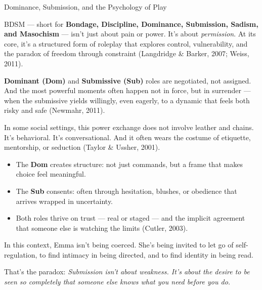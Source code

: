 \begin{TechnicalSidebar}{Dominance, Submission, and the Psychology of Play}

  BDSM --- short for \textbf{Bondage, Discipline, Dominance, Submission, Sadism, and Masochism} --- isn’t 
  just about pain or power.  
  It’s about \textit{permission}. At its core, it’s a structured form of roleplay that explores control, 
  vulnerability, and the paradox of freedom through constraint (Langdridge \& Barker, 2007; Weiss, 2011).
  
  \medskip
  
  \textbf{Dominant (Dom)} and \textbf{Submissive (Sub)} roles are negotiated, not assigned.  
  And the most powerful moments often happen not in force, but in surrender --- when the submissive 
  yields willingly, even eagerly, to a dynamic that feels both risky and safe (Newmahr, 2011).
  
  \medskip
  
  In some social settings, this power exchange does not involve leather and chains.  
  It’s behavioral.  
  It’s conversational.  
  And it often wears the costume of etiquette, mentorship, or seduction (Taylor \& Ussher, 2001).
  
  \medskip
  
  \begin{itemize}
    \item The \textbf{Dom} creates structure: not just commands, but a frame that makes choice feel 
    meaningful.
    \item The \textbf{Sub} consents: often through hesitation, blushes, or obedience that arrives 
    wrapped in uncertainty.
    \item Both roles thrive on trust --- real or staged --- and the implicit agreement that someone 
    else is watching the limits (Cutler, 2003).
  \end{itemize}
  
  \medskip
  
  In this context, Emma isn’t being coerced.  
  She’s being invited to let go of self-regulation, to find intimacy in being directed, and to find 
  identity in being read.
  
  \medskip
  
  That’s the paradox:  
  \textit{Submission isn’t about weakness. It’s about the desire to be seen so completely that 
  someone else knows what you need before you do.}
  
\end{TechnicalSidebar}


